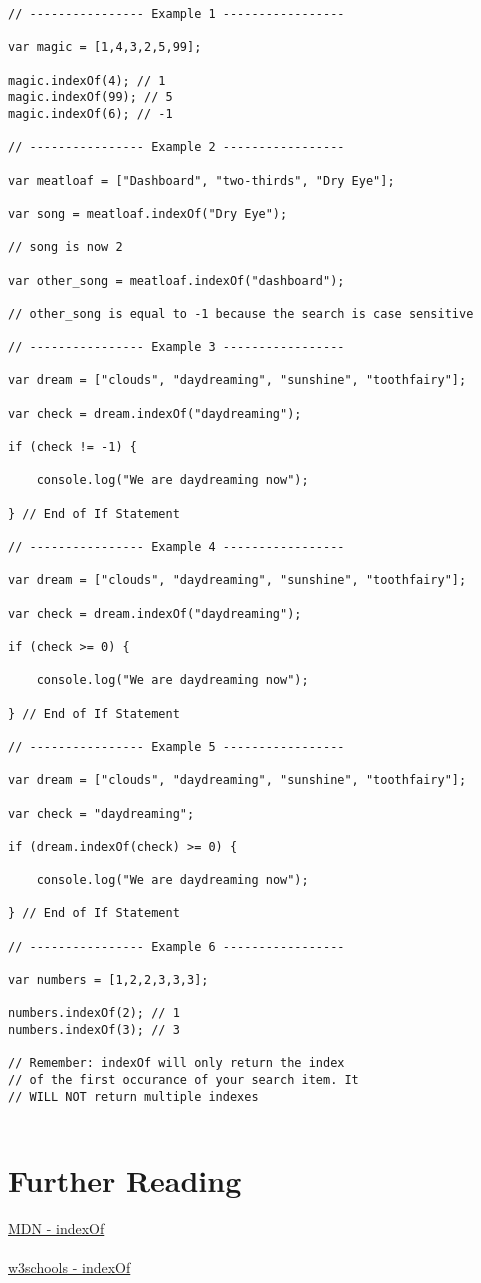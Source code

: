 \documentclass[12pt, letterpaper]{article}
\begin{document}
\begin{lstlisting}
// ---------------- Example 1 -----------------

var magic = [1,4,3,2,5,99];

magic.indexOf(4); // 1
magic.indexOf(99); // 5
magic.indexOf(6); // -1

// ---------------- Example 2 -----------------

var meatloaf = ["Dashboard", "two-thirds", "Dry Eye"];

var song = meatloaf.indexOf("Dry Eye");

// song is now 2 

var other_song = meatloaf.indexOf("dashboard");

// other_song is equal to -1 because the search is case sensitive 

// ---------------- Example 3 -----------------   

var dream = ["clouds", "daydreaming", "sunshine", "toothfairy"];

var check = dream.indexOf("daydreaming");

if (check != -1) {

	console.log("We are daydreaming now");

} // End of If Statement

// ---------------- Example 4 -----------------

var dream = ["clouds", "daydreaming", "sunshine", "toothfairy"];

var check = dream.indexOf("daydreaming");

if (check >= 0) {

	console.log("We are daydreaming now");

} // End of If Statement

// ---------------- Example 5 -----------------

var dream = ["clouds", "daydreaming", "sunshine", "toothfairy"];

var check = "daydreaming";

if (dream.indexOf(check) >= 0) {

	console.log("We are daydreaming now");

} // End of If Statement

// ---------------- Example 6 -----------------

var numbers = [1,2,2,3,3,3];

numbers.indexOf(2); // 1
numbers.indexOf(3); // 3

// Remember: indexOf will only return the index
// of the first occurance of your search item. It
// WILL NOT return multiple indexes


\end{lstlisting}

\section*{Further Reading}

\href{https://developer.mozilla.org/en-US/docs/Web/JavaScript/Reference/Global_Objects/Array/indexOf}{MDN - indexOf}\\
\\
\href{http://www.w3schools.com/jsref/jsref_indexof_array.asp}{w3schools - indexOf}\\
\end{document}
